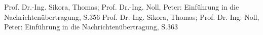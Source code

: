 

\begin{thebibliography}{999}
       Prof. Dr.-Ing. Sikora, Thomas; Prof. Dr.-Ing. Noll, Peter: Einführung in die
      Nachrichtenübertragung, S.356
       Prof. Dr.-Ing. Sikora, Thomas; Prof. Dr.-Ing. Noll, Peter: Einführung in die
      Nachrichtenübertragung, S.363
%      



\end{thebibliography}


        
